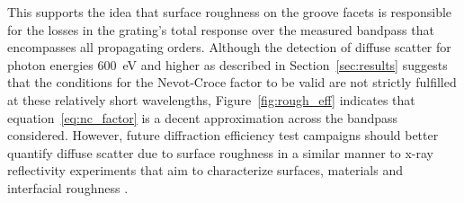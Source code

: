 \documentclass{aastex63}
\begin{document}
This supports the idea that surface roughness on the groove facets is responsible for the losses in the grating's total response over the measured bandpass that encompasses all propagating orders. 
Although the detection of diffuse scatter for photon energies 600~eV and higher as described in Section~\ref{sec:results} suggests that the conditions for the Nevot-Croce factor to be valid are not strictly fulfilled at these relatively short wavelengths, Figure~\ref{fig:rough_eff} indicates that equation~\ref{eq:nc_factor} is a decent approximation across the bandpass considered.
However, future diffraction efficiency test campaigns should better quantify diffuse scatter due to surface roughness in a similar manner to x-ray reflectivity experiments that aim to characterize surfaces, materials and interfacial roughness \citep{Gay1999,Baumbach1999}. 
\end{document}
